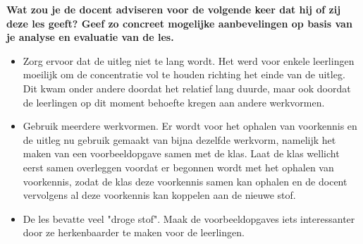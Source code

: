 \documentclass{article}
\begin{document}
                \textbf{Wat zou je de docent adviseren voor de volgende keer dat hij of zij deze les geeft? Geef zo concreet mogelijke aanbevelingen op basis van je analyse en evaluatie van de les.} \\
                \begin{itemize}
                    \item Zorg ervoor dat de uitleg niet te lang wordt. Het werd voor enkele leerlingen moeilijk om de concentratie vol te houden richting het einde van de uitleg. Dit kwam onder andere doordat het relatief lang duurde, maar ook doordat de leerlingen op dit moment behoefte kregen aan andere werkvormen.
                    \item Gebruik meerdere werkvormen. Er wordt voor het ophalen van voorkennis en de uitleg nu gebruik gemaakt van bijna dezelfde werkvorm, namelijk het maken van een voorbeeldopgave samen met de klas. Laat de klas wellicht eerst samen overleggen voordat er begonnen wordt met het ophalen van voorkennis, zodat de klas deze voorkennis samen kan ophalen en de docent vervolgens al deze voorkennis kan koppelen aan de nieuwe stof.
                    \item De les bevatte veel "droge stof". Maak de voorbeeldopgaves iets interessanter door ze herkenbaarder te maken voor de leerlingen. 
                \end{itemize}
                \newpage
    
\end{document}
